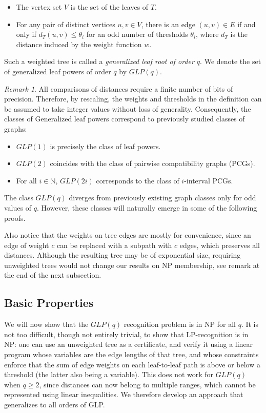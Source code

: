 \documentclass[11pt, letter]{article}
\theoremstyle{remark}
\newtheorem*{remark}{Remark}
\begin{document}
\begin{itemize} 
    \item The vertex set $V$ is the set of the leaves of $T$.
    \item For any pair of distinct vertices $u, v \in V$, there is an edge $(u,v) \in E$ if and only if $d_T(u, v) \leq \theta_i$ for an odd number of thresholds $\theta_i$, where $d_T$ is the distance induced by the weight function $w$. 
\end{itemize}

Such a weighted tree is called a \emph{generalized leaf root of order $q$}.
We denote the set of generalized leaf powers of order $q$ by $GLP(q)$.



\begin{remark}
    All comparisons of distances require a finite number of bits of precision. Therefore, by rescaling, the weights and thresholds in the definition can be assumed to take integer values without loss of generality.    Consequently, the classes of Generalized leaf powers correspond to previously studied classes of graphs:

    \begin{itemize} 
        \item $GLP(1)$ is precisely the class of leaf powers.
        \item $GLP(2)$ coincides with the class of pairwise compatibility graphs (PCGs).
        \item For all $i \in \mathbb{N}$, $GLP(2i)$ corresponds to the class of $i$-interval PCGs.
    \end{itemize}
    
    The class $GLP(q)$ diverges from previously existing graph classes only for odd values of $q$. However, these classes will naturally emerge in some of the following proofs.

    Also notice that the weights on tree edges are mostly for convenience, since an edge of weight $c$ can be replaced with a subpath with $c$ edges, which preserves all distances.  Although the resulting tree may be of exponential size, requiring unweighted trees would not change our results on NP membership, see remark at the end of the next subsection.
\end{remark}
\subsection{Basic Properties}

We will now show that the $GLP(q)$ recognition problem is in NP for all $q$. It is not too difficult, though not entirely trivial, to show that LP-recognition is in NP: one can use an unweighted tree as a certificate, and verify it using a linear program whose variables are the edge lengths of that tree, and whose constraints enforce that the sum of edge weights on each leaf-to-leaf path is above or below a threshold (the latter also being a variable).  This does not work for $GLP(q)$ when $q \geq 2$, since distances can now belong to multiple ranges, which cannot be represented using linear inequalities. We therefore develop an approach that generalizes to all orders of GLP.
\end{document}
